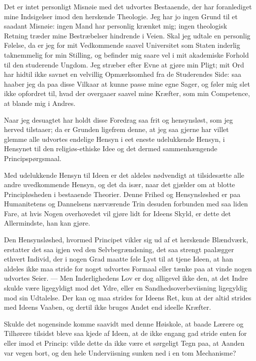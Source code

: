 \documentclass[12pt,a4paper]{book}
\newcommand{\opage}[1]{\marginnote{\footnotesize\textit{[#1]}}}
\begin{document}
Det er intet personligt Misnøie med det udvortes Bestaaende, der har
foranlediget mine Indsigelser imod den herskende Theologie. Jeg har jo ingen
Grund til et saadant Misnøie: ingen Mand har personlig krænket mig; ingen
theologisk Retning træder mine Bestræbelser hindrende i Veien. Skal jeg
udtale en personlig Følelse, da er jeg for mit Vedkommende saavel Universitet
som Staten inderlig taknemmelig for min Stilling, og befinder mig saare vel i
mit akademiske Forhold til den studerende Ungdom. Jeg stræber efter Evne at
gjøre min Pligt; mit Ord har hidtil ikke savnet en velvillig Opmærksomhed fra
de
\opage{170} Studerendes Side: saa haaber jeg da paa disse Vilkaar at kunne passe mine
egne Sager, og føler mig slet ikke opfordret til, hvad der overgaaer saavel
mine Kræfter, som min Competence, at blande mig i Andres.

Naar jeg desuagtet har holdt disse Foredrag saa frit og hensynsløst, som jeg
herved tilstaaer; da er Grunden ligefrem denne, at jeg saa gjerne har villet
glemme alle udvortes endelige Hensyn i eet eneste udelukkende Hensyn, i
Hensynet til den religiøs-ethiske Idee og det dermed sammenhængende
Principspørgsmaal.

Med udelukkende Hensyn til Ideen er det aldeles nødvendigt at tilsidesætte
alle andre uvedkommende Hensyn, og det da især, naar det gjælder om at blotte
Principløsheden i bestaaende Theorier. Denne Frihed og Hensynsløshed er paa
Humanitetens og Dannelsens nærværende Trin desuden forbunden med saa liden
Fare, at hvis Nogen overhovedet vil gjøre lidt for Ideens Skyld, er dette det
Allermindste, han kan gjøre.

Den Hensynsløshed, hvormed Principet vikler sig ud af et herskende
Blændværk, erstatter det saa igjen ved den Selvbegrændsning, det saa strengt
paalægger ethvert Individ, der i nogen Grad maatte føle Lyst til at tjene
Ideen, at han aldeles ikke maa stride for noget udvortes Formaal eller tænke
paa at vinde nogen udvortes Seier. --- Men Inderlighedens Lov er dog
alligevel ikke den, at det Indre skulde være ligegyldigt mod det Ydre, eller
en Sandhedsoverbeviisning ligegyldig mod sin Udtalelse. Der kan og maa
strides for Ideens Ret, kun at der altid strides med Ideens Vaaben, og dertil
ikke bruges Andet end ideelle Kræfter.

Skulde det nogensinde komme saavidt med denne Høiskole, at baade Lærere og
Tilhørere tilsidst bleve saa kjede af Ideen, at de ikke engang gad stride
enten for eller imod et Princip: vilde dette da ikke være et sørgeligt Tegn
paa, at Aanden var
\opage{171} vegen bort, og den hele Underviisning sunken ned i en tom Mechanisme?
\end{document}
